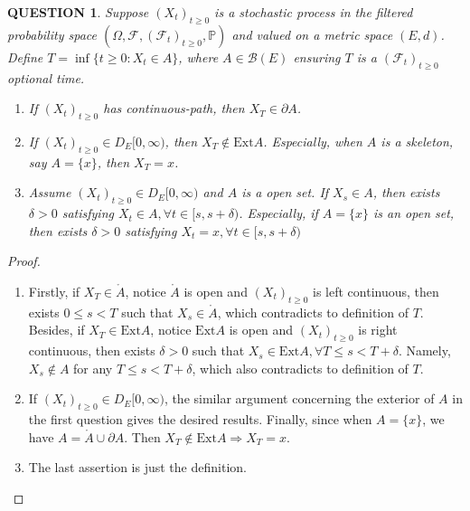 \documentclass[12pt]{article}
\renewcommand{\b}{\mathscr{B}}
\renewcommand{\(}{\left(}%
\renewcommand{\)}{\right)}%
\renewcommand{\[}{\left[}%
\renewcommand{\]}{\right]}%
\newcommand{\p}{\mathbb{P}}
\newcommand{\f}{\mathscr{F}}
\newtheorem{question}{QUESTION}[section]}
\newtheorem{proof}{Proof.}}
\begin{document}
  \begin{question}
    Suppose $(X_t)_{t\geq 0}$ is a stochastic process in the filtered probability space $(\Omega,\f,(\f_t)_{t\geq 0},\p )$ and valued on a metric space $(E,d)$. Define $T=\inf\{t\geq 0:X_t\in A\}$, where $A\in \b(E)$ ensuring $T$ is a $(\f_t)_{t\geq 0}$ optional time. 
    \begin{enumerate}
    	\item If $(X_t)_{t\geq 0}$ has continuous-path, then $X_T\in\partial A$.
    	\item If $(X_t)_{t\geq 0}\in D_E[0,\infty)$, then $X_T\notin \mathrm{Ext}A$. Especially, when $A$ is a skeleton, say $A=\{x\}$, then $X_T=x$.
    	\item Assume $(X_t)_{t\geq 0}\in D_E[0,\infty)$ and $A$ is a open set. If $X_s\in A$, then exists $\delta>0$ satisfying $X_t\in A,\forall t\in[s,s+\delta)$. Especially, if $A=\{x\}$ is an open set, then exists $\delta>0$ satisfying $X_t=x,\forall t\in[s,s+\delta)$
    \end{enumerate}
  \end{question}
  \begin{proof}
    \begin{enumerate}
    	\item Firstly, if $X_T\in \mathring{A}$, notice $\mathring{A}$ is open and $(X_t)_{t\geq 0}$ is left continuous, then exists $0\leq s<T$ such that $X_s\in \mathring{A}$, which contradicts to definition of $T$. Besides, if $X_T\in \text{Ext}A$, notice $\text{Ext}{A}$ is open and $(X_t)_{t\geq 0}$ is right continuous, then exists $\delta>0$ such that $X_s\in \text{Ext}{A}, \forall T\leq s<T+\delta$. Namely, $X_s\notin A$ for any $T\leq s<T+\delta$,  which also contradicts to definition of $T$.
    	\item If $(X_t)_{t\geq 0}\in D_E[0,\infty)$, the similar argument concerning the exterior of $A$ in the first question gives the desired results. Finally, since when $A=\{x\}$, we have $A=\mathring{A}\cup\partial A$. Then $X_T\notin \mathrm{Ext}A\Longrightarrow X_T=x$.
    	\item The last assertion is just the definition.
    \end{enumerate}
  \end{proof}
  
\end{document}
